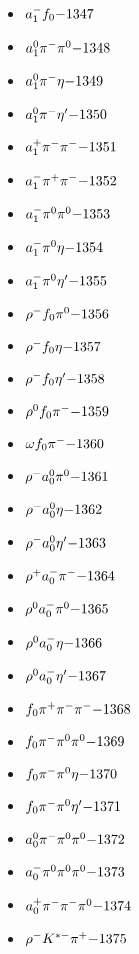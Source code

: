 \begin{multicols}{3}
\begin{itemize}
 \item $ a_{1}^{-} f_{0} \hfill{-1347}$
 \item $ a_{1}^{0} \pi^{-} \pi^{0} \hfill{-1348}$
 \item $ a_{1}^{0} \pi^{-} \eta \hfill{-1349}$
 \item $ a_{1}^{0} \pi^{-} {\eta^{\prime}} \hfill{-1350}$
 \item $ a_{1}^{+} \pi^{-} \pi^{-} \hfill{-1351}$
 \item $ a_{1}^{-} \pi^{+} \pi^{-} \hfill{-1352}$
 \item $ a_{1}^{-} \pi^{0} \pi^{0} \hfill{-1353}$
 \item $ a_{1}^{-} \pi^{0} \eta \hfill{-1354}$
 \item $ a_{1}^{-} \pi^{0} {\eta^{\prime}} \hfill{-1355}$
 \item $ \rho^{-} f_{0} \pi^{0} \hfill{-1356}$
 \item $ \rho^{-} f_{0} \eta \hfill{-1357}$
 \item $ \rho^{-} f_{0} {\eta^{\prime}} \hfill{-1358}$
 \item $ \rho^{0} f_{0} \pi^{-} \hfill{-1359}$
 \item $ \omega f_{0} \pi^{-} \hfill{-1360}$
 \item $ \rho^{-} a_{0}^{0} \pi^{0} \hfill{-1361}$
 \item $ \rho^{-} a_{0}^{0} \eta \hfill{-1362}$
 \item $ \rho^{-} a_{0}^{0} {\eta^{\prime}} \hfill{-1363}$
 \item $ \rho^{+} a_{0}^{-} \pi^{-} \hfill{-1364}$
 \item $ \rho^{0} a_{0}^{-} \pi^{0} \hfill{-1365}$
 \item $ \rho^{0} a_{0}^{-} \eta \hfill{-1366}$
 \item $ \rho^{0} a_{0}^{-} {\eta^{\prime}} \hfill{-1367}$
 \item $ f_{0} \pi^{+} \pi^{-} \pi^{-} \hfill{-1368}$
 \item $ f_{0} \pi^{-} \pi^{0} \pi^{0} \hfill{-1369}$
 \item $ f_{0} \pi^{-} \pi^{0} \eta \hfill{-1370}$
 \item $ f_{0} \pi^{-} \pi^{0} {\eta^{\prime}} \hfill{-1371}$
 \item $ a_{0}^{0} \pi^{-} \pi^{0} \pi^{0} \hfill{-1372}$
 \item $ a_{0}^{-} \pi^{0} \pi^{0} \pi^{0} \hfill{-1373}$
 \item $ a_{0}^{+} \pi^{-} \pi^{-} \pi^{0} \hfill{-1374}$
 \item $ \rho^{-} K^{*-} \pi^{+} \hfill{-1375}$

\end{itemize}
\end{multicols}
